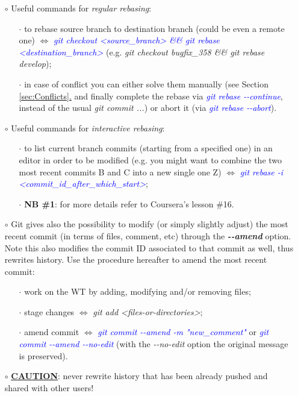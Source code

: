 \documentclass[a4paper,portrait,10pt]{article}   %
\newcommand{\mybulletlvA}{$\circ$}   %
\newcommand{\mybulletlvB}{$\cdot$}   %
\newcommand{\mydiv}{$\Leftrightarrow$ }   %
\newcommand{\mysapo}[1]{\textquotesingle #1\textquotesingle }   %
\newcommand{\mycmd}[1]{\textcolor{blue}{\textit{#1}}}   %
\newcommand{\myvspace}{\vspace{4mm}}   %
\newcommand{\mysecref}[1]{\hyperref[#1]{\ref{#1}.}}   %
\begin{document}
\begin{itemize}
\item[\mybulletlvA] Useful commands for \textit{regular rebasing}:
\begin{itemize}
  \item[\mybulletlvB] to rebase source branch to destination branch (could be even a remote one) \mydiv \mycmd{git checkout <source\_branch> \&\& git rebase <destination\_branch>} (e.g. \textit{git checkout bugfix\_358 \&\& git rebase develop});
  \item[\mybulletlvB] in case of conflict you can either solve them manually (see Section \mysecref{sec:Conflicts} and finally complete the rebase via \mycmd{git rebase -{}-continue}, instead of the usual \textit{git commit ...}) or abort it (via \mycmd{git rebase -{}-abort}).
\end{itemize}
\myvspace

\item[\mybulletlvA] Useful commands for \textit{interactive rebasing}:
\begin{itemize}
  \item[\mybulletlvB] to list current branch commits (starting from a specified one) in an editor in order to be modified (e.g. you might want to combine the two most recent commits \mysapo{B} and \mysapo{C} into a new single one \mysapo{Z}) \mydiv \mycmd{git rebase -i <commit\_id\_after\_which\_start>};
  \item[\mybulletlvB] \textbf{NB \#1}: for more details refer to Coursera's lesson \#16.
\end{itemize}
\myvspace

\item[\mybulletlvA] Git gives also the possibility to modify (or simply slightly adjust) the most recent commit (in terms of files, comment, etc) through the \textbf{\textit{-{}-amend}} option. Note this also modifies the commit ID associated to that commit as well, thus rewrites history. Use the procedure hereafter to amend the most recent commit:
\begin{itemize}
  \item[\mybulletlvB] work on the WT by adding, modifying and/or removing files;
  \item[\mybulletlvB] stage changes \mydiv \textit{git add <files-or-directories>};
  \item[\mybulletlvB] amend commit \mydiv \mycmd{git commit -{}-amend -m "new\_comment"} or \mycmd{git commit -{}-amend -{}-no-edit} (with the \textit{-{}-no-edit} option the original message is preserved).
\end{itemize}
\myvspace

\item[\mybulletlvA] \textbf{\underline{CAUTION}}: never rewrite history that has been already pushed and shared with other users!
\end{itemize}
\myvspace
\end{document}
